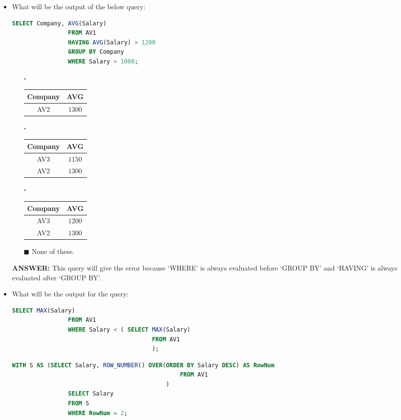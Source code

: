 \documentclass[10pt]{article}
\newcommand{\lightrule}{%
	\arrayrulecolor{black!30}%
	\midrule[\lightrulewidth]%
	\arrayrulecolor{black}}
\begin{document}
\begin{itemize}
		\newpage

		\item What will be the output of the below query: 
			\begin{lstlisting}[language=SQL,firstline=1, lastline=5] 
				SELECT Company, AVG(Salary) 
				FROM AV1 
				HAVING AVG(Salary) > 1200 
				GROUP BY Company 
				WHERE Salary > 1000;
			\end{lstlisting}
		
			\begin{enumerate}
				\item[$\square$]
					\begin{tabular}{@{} *{2}{c} @{}}
						\toprule
							\textbf{Company} & \textbf{AVG} \\
						\midrule
							AV2 & $1300$ \\
						\bottomrule
					\end{tabular}

				\item[$\square$]
					\begin{tabular}{@{} *{2}{c} @{}}
						\toprule
							\textbf{Company} & \textbf{AVG} \\
						\midrule
							AV3 & $1150$ \\
						\lightrule
							AV2 & $1300$ \\
						\bottomrule
					\end{tabular}

				\item[$\square$]
					\begin{tabular}{@{} *{2}{c} @{}}
						\toprule
							\textbf{Company} & \textbf{AVG} \\
						\midrule
							AV3 & $1200$ \\
						\lightrule
							AV2 & $1300$ \\
						\bottomrule
					\end{tabular}

				\item[$\blacksquare$] None of these.
			\end{enumerate}
			\color{red} \textbf{ANSWER:} \color{black} This query will give the error because ‘WHERE’ is always evaluated before ‘GROUP BY’ and ‘HAVING’ is always evaluated after ‘GROUP BY’.

		\item What will be the output for the query:
			\begin{lstlisting}[language=SQL,firstline=1, lastline=6] 
				SELECT MAX(Salary) 
				FROM AV1 
				WHERE Salary < ( SELECT MAX(Salary) 
										FROM AV1 
										);
			\end{lstlisting}
			\begin{lstlisting}[language=SQL,firstline=1, lastline=6] 
				WITH S AS (SELECT Salary, ROW_NUMBER() OVER(ORDER BY Salary DESC) AS RowNum 
												FROM AV1
											) 
				SELECT Salary 
				FROM S 
				WHERE RowNum = 2;
			\end{lstlisting}


\end{itemize}
\end{document}
